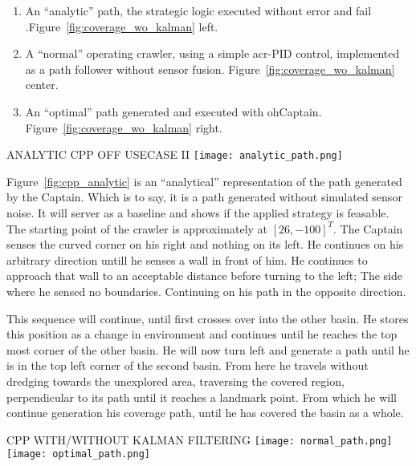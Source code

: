 \begin{enumerate}
    \item An ``analytic'' path, the strategic logic executed without error and fail
    .Figure~\ref{fig:coverage_wo_kalman} left.
    \item A ``normal'' operating crawler, using a simple \gls{acr-PID} control, implemented as a path follower without
    sensor fusion. Figure~\ref{fig:coverage_wo_kalman} center.
    \item An ``optimal'' path generated and executed with ohCaptain. Figure~\ref{fig:coverage_wo_kalman} right.
\end{enumerate}

\begin{RoyalFigure}[htb, label=fig:cpp_analytic]{ANALYTIC CPP OFF USECASE II}
    \texttt{[image: analytic\_path.png]}
\end{RoyalFigure}

Figure~\ref{fig:cpp_analytic} is an ``analytical'' representation of the path generated by the Captain. Which is to
say, it is a path generated without simulated sensor noise. It will server as a baseline and shows if the applied
strategy is feasable. The starting point of the crawler is approximately at \( [26, -100]^T \). The Captain senses
the curved corner on his right and nothing on its left. He continues on his arbitrary direction untill he senses a
wall in front of him. He continues to approach that wall to an acceptable distance before turning to the left; The
side where he sensed no boundaries. Continuing on his path in the opposite direction.

This sequence will continue, until first crosses over into the other basin. He stores this position as a change in
environment and continues until he reaches the top most corner of the other basin. He will now turn left and generate
a path until he is in the top left corner of the second basin. From here he travels without dredging towards the
unexplored area, traversing the covered region, perpendicular to its path until it reaches a landmark point. From
which he will continue generation his coverage path, until he has covered the basin as a whole.

\begin{RoyalFigure}[htb, label=fig:coverage_wo_kalman]{CPP WITH/WITHOUT KALMAN FILTERING}
    \texttt{[image: normal\_path.png]}
    \texttt{[image: optimal\_path.png]}
\end{RoyalFigure}

